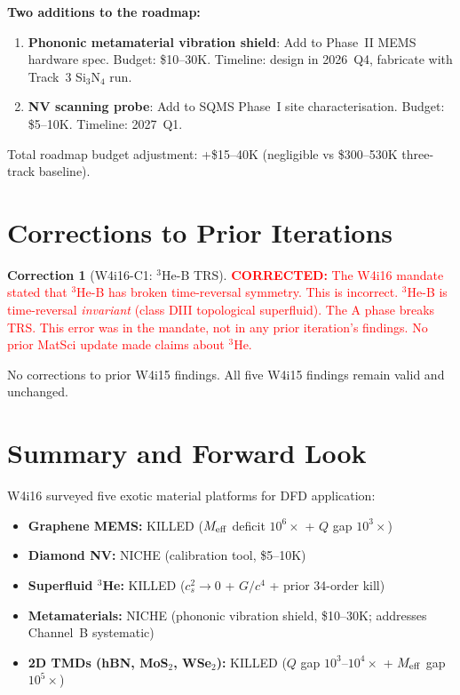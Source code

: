 \documentclass[11pt]{article}
\theoremstyle{definition}
\newtheorem{correction}[theorem]{Correction}
\theoremstyle{remark}
\newcommand{\Meff}{M_{\rm eff}}
\newcommand{\corrected}[1]{\textcolor{red}{\textbf{CORRECTED:} #1}}
\begin{document}
\textbf{Two additions to the roadmap:}
\begin{enumerate}
\item \textbf{Phononic metamaterial vibration shield}: Add to Phase~II
  MEMS hardware spec. Budget: \$10--30K. Timeline: design in 2026~Q4,
  fabricate with Track~3 Si$_3$N$_4$ run.
\item \textbf{NV scanning probe}: Add to SQMS Phase~I site
  characterisation. Budget: \$5--10K. Timeline: 2027~Q1.
\end{enumerate}

Total roadmap budget adjustment: +\$15--40K (negligible vs \$300--530K
three-track baseline).


\section{Corrections to Prior Iterations}
\label{sec:corrections}

\begin{correction}[W4i16-C1: $^3$He-B TRS]
\corrected{The W4i16 mandate stated that $^3$He-B has broken
time-reversal symmetry. This is incorrect. $^3$He-B is time-reversal
\textit{invariant} (class DIII topological superfluid). The A phase
breaks TRS. This error was in the mandate, not in any prior
iteration's findings. No prior MatSci update made claims about $^3$He.}
\end{correction}

No corrections to prior W4i15 findings. All five W4i15 findings remain
valid and unchanged.


\section{Summary and Forward Look}
\label{sec:summary}

W4i16 surveyed five exotic material platforms for DFD application:
\begin{itemize}[nosep]
\item \textbf{Graphene MEMS:} KILLED ($\Meff$ deficit $10^6\times$
  + $Q$ gap $10^3\times$)
\item \textbf{Diamond NV:} NICHE (calibration tool, \$5--10K)
\item \textbf{Superfluid $^3$He:} KILLED ($c_s^2 \to 0$ + $G/c^4$
  + prior 34-order kill)
\item \textbf{Metamaterials:} NICHE (phononic vibration shield,
  \$10--30K; addresses Channel~B systematic)
\item \textbf{2D TMDs (hBN, MoS$_2$, WSe$_2$):} KILLED ($Q$ gap
  $10^3$--$10^4\times$ + $\Meff$ gap $10^5\times$)
\end{itemize}
\end{document}

